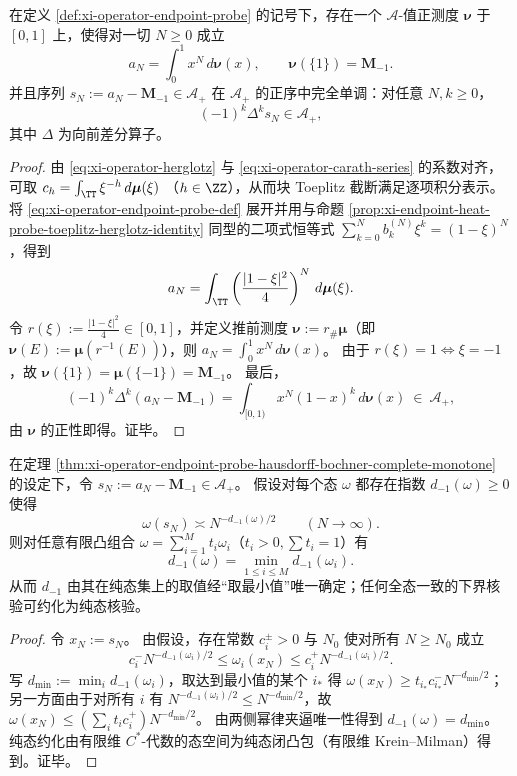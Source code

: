 \begin{theorem}\label{thm:xi-operator-endpoint-probe-hausdorff-bochner-complete-monotone}
在定义 \ref{def:xi-operator-endpoint-probe} 的记号下，存在一个 \(\mathcal{A}\)-值正测度 \(\boldsymbol\nu\) 于 \([0,1]\) 上，使得对一切 \(N\ge 0\) 成立
\[
\boxed{\;
a_N=\int_{0}^{1}x^{N}\,d\boldsymbol\nu(x),\qquad
\boldsymbol\nu(\{1\})=\mathbf{M}_{-1}.\;}
\]
并且序列 \(s_N:=a_N-\mathbf{M}_{-1}\in\mathcal{A}_+\) 在 \(\mathcal{A}_+\) 的正序中完全单调：对任意 \(N,k\ge 0\)，
\[
\boxed{\;(-1)^k\Delta^k s_N\in\mathcal{A}_+,\;}
\]
其中 \(\Delta\) 为向前差分算子。
\end{theorem}
\begin{proof}
由 \eqref{eq:xi-operator-herglotz} 与 \eqref{eq:xi-operator-carath-series} 的系数对齐，可取
\(
c_h=\int_{\TT}\xi^{-h}\,d\boldsymbol\mu(\xi)
\)
（\(h\in\ZZ\)），从而块 Toeplitz 截断满足逐项积分表示。
将 \eqref{eq:xi-operator-endpoint-probe-def} 展开并用与命题 \ref{prop:xi-endpoint-heat-probe-toeplitz-herglotz-identity} 同型的二项式恒等式
\(
\sum_{k=0}^{N}b^{(N)}_k\xi^{k}=(1-\xi)^N
\)，得到
\[
a_N=\int_{\TT}\left(\frac{|1-\xi|^{2}}{4}\right)^{N}\,d\boldsymbol\mu(\xi).
\]
令 \(r(\xi):=\frac{|1-\xi|^2}{4}\in[0,1]\)，并定义推前测度 \(\boldsymbol\nu:=r_\#\boldsymbol\mu\)（即 \(\boldsymbol\nu(E):=\boldsymbol\mu(r^{-1}(E))\)），则
\(
a_N=\int_{0}^{1}x^N\,d\boldsymbol\nu(x)
\)。
由于 \(r(\xi)=1\iff \xi=-1\)，故 \(\boldsymbol\nu(\{1\})=\boldsymbol\mu(\{-1\})=\mathbf{M}_{-1}\)。
最后，
\[
(-1)^k\Delta^k(a_N-\mathbf{M}_{-1})
=\int_{[0,1)}x^{N}(1-x)^{k}\,d\boldsymbol\nu(x)\ \in\ \mathcal{A}_+,
\]
由 \(\boldsymbol\nu\) 的正性即得。证毕。
\end{proof}

\begin{proposition}[逐态谱维数的下包络规律]\label{prop:xi-statewise-endpoint-dimension-lower-envelope}
在定理 \ref{thm:xi-operator-endpoint-probe-hausdorff-bochner-complete-monotone} 的设定下，令 \(s_N:=a_N-\mathbf{M}_{-1}\in\mathcal{A}_+\)。
假设对每个态 \(\omega\) 都存在指数 \(d_{-1}(\omega)\ge 0\) 使得
\[
\omega(s_N)\asymp N^{-d_{-1}(\omega)/2}\qquad(N\to\infty).
\]
则对任意有限凸组合 \(\omega=\sum_{i=1}^{M}t_i\omega_i\)（\(t_i>0,\sum t_i=1\)）有
\[
\boxed{\;d_{-1}(\omega)=\min_{1\le i\le M}d_{-1}(\omega_i).\;}
\]
从而 \(d_{-1}\) 由其在纯态集上的取值经“取最小值”唯一确定；任何全态一致的下界核验可约化为纯态核验。
\end{proposition}
\begin{proof}
令 \(x_N:=s_N\)。
由假设，存在常数 \(c_i^\pm>0\) 与 \(N_0\) 使对所有 \(N\ge N_0\) 成立
\[
c_i^-N^{-d_{-1}(\omega_i)/2}\le \omega_i(x_N)\le c_i^+N^{-d_{-1}(\omega_i)/2}.
\]
写 \(d_{\min}:=\min_i d_{-1}(\omega_i)\)，取达到最小值的某个 \(i_\ast\) 得
\(
\omega(x_N)\ge t_{i_\ast}c_{i_\ast}^-N^{-d_{\min}/2}
\)；
另一方面由于对所有 \(i\) 有 \(N^{-d_{-1}(\omega_i)/2}\le N^{-d_{\min}/2}\)，故
\(
\omega(x_N)\le (\sum_i t_ic_i^+)N^{-d_{\min}/2}
\)。
由两侧幂律夹逼唯一性得到 \(d_{-1}(\omega)=d_{\min}\)。
纯态约化由有限维 \(C^\ast\)-代数的态空间为纯态闭凸包（有限维 Krein--Milman）得到。证毕。
\end{proof}

